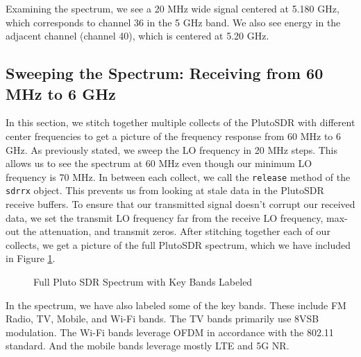 \documentclass{article}
\begin{document}
Examining the spectrum, we see a 20 MHz wide signal centered at 5.180 GHz, which corresponds to channel 36 in the 5 GHz band. We also see energy in the adjacent channel (channel 40), which is centered at 5.20 GHz.

\subsection{Sweeping the Spectrum: Receiving from 60 MHz to 6 GHz}

In this section, we stitch together multiple collects of the PlutoSDR with different center frequencies to get a picture of the frequency response from 60 MHz to 6 GHz. As previously stated, we sweep the LO frequency in 20 MHz steps. This allows us to see the spectrum at 60 MHz even though our minimum LO frequency is 70 MHz. In between each collect, we call the \texttt{release} method of the \texttt{sdrrx} object. This prevents us from looking at stale data in the PlutoSDR receive buffers. To ensure that our transmitted signal doesn't corrupt our received data, we set the transmit LO frequency far from the receive LO frequency, max-out the attenuation, and transmit zeros. After stitching together each of our collects, we get a picture of the full PlutoSDR spectrum, which we have included in Figure \ref{fig::full_spectrum_labeled}.

\begin{figure}[H]
	\centerline{}
	\caption{Full Pluto SDR Spectrum with Key Bands Labeled}
	\label{fig::full_spectrum_labeled}
\end{figure}

In the spectrum, we have also labeled some of the key bands. These include FM Radio, TV, Mobile, and Wi-Fi bands. The TV bands primarily use 8VSB modulation. The Wi-Fi bands leverage OFDM in accordance with the 802.11 standard. And the mobile bands leverage mostly LTE and 5G NR.
\end{document}
